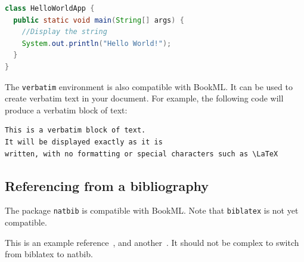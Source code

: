 \begin{lstlisting}[language=Java]
class HelloWorldApp {
  public static void main(String[] args) {
    //Display the string
    System.out.println("Hello World!");
  }
}
\end{lstlisting}
The \texttt{verbatim} environment is also compatible with BookML. It can be used to create verbatim text in your document. For example, the following code will produce a verbatim block of text:

\begin{verbatim}
This is a verbatim block of text.
It will be displayed exactly as it is 
written, with no formatting or special characters such as \LaTeX
\end{verbatim}

\subsection{Referencing from a bibliography}
\label{bib}

The package \texttt{natbib} is compatible with BookML. Note that \texttt{biblatex} is not yet compatible.

This is an example reference~\cite{strikwerda2004}, and another~\citep{parret2016time}. It should not be complex to switch from biblatex to natbib. 


